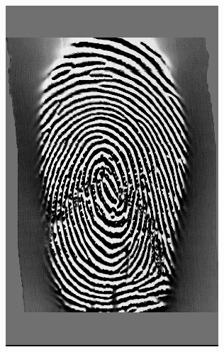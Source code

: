 \documentclass[11pt,a4paper]{article}
\begin{document}
\begin{figure}[h]
\begin{subfigure}{0.25\textwidth}
		\includegraphics[width=.95\linewidth]{images/Screenshot_2}
	\end{subfigure}%
	\begin{subfigure}{0.25\textwidth}
		\centering

\end{subfigure}
\end{figure}
\end{document}
